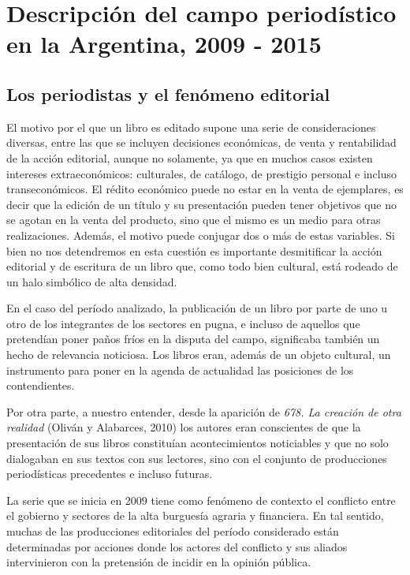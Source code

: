 \chapter{Descripción del campo periodístico en la Argentina, 2009 - 2015}

\section{Los periodistas y el fenómeno editorial}

El motivo por el que un libro es editado supone una serie de consideraciones diversas, entre las que se incluyen decisiones económicas, de venta y rentabilidad de la acción editorial, aunque no solamente, ya que en muchos casos existen intereses extraeconómicos: culturales, de catálogo, de prestigio personal e incluso transeconómicos. El rédito económico puede no estar en la venta de ejemplares, es decir que la edición de un título y su presentación pueden tener objetivos que no se agotan en la venta del producto, sino que el mismo es un medio para otras realizaciones. Además, el motivo puede conjugar dos o más de estas variables. Si bien no nos detendremos en esta cuestión es importante desmitificar la acción editorial y de escritura de un libro que, como todo bien cultural, está rodeado de un halo simbólico de alta densidad.

En el caso del período analizado, la publicación de un libro por parte de uno u otro de los integrantes de los sectores en pugna, e incluso de aquellos que pretendían poner paños fríos en la disputa del campo, significaba también un hecho de relevancia noticiosa. Los libros eran, además de un objeto cultural, un instrumento para poner en la agenda de actualidad las posiciones de los contendientes.

Por otra parte, a nuestro entender, desde la aparición de \emph{678. La creación de otra realidad} (Oliván y Alabarces, 2010) los autores eran conscientes de que la presentación de sus libros constituían acontecimientos noticiables y que no solo dialogaban en sus textos con sus lectores, sino con el conjunto de producciones periodísticas precedentes e incluso futuras.

La serie que se inicia en 2009 tiene como fenómeno de contexto el conflicto entre el gobierno y sectores de la alta burguesía agraria y financiera. En tal sentido, muchas de las producciones editoriales del período considerado están determinadas por acciones donde los actores del conflicto y sus aliados intervinieron con la pretensión de incidir en la opinión pública.

